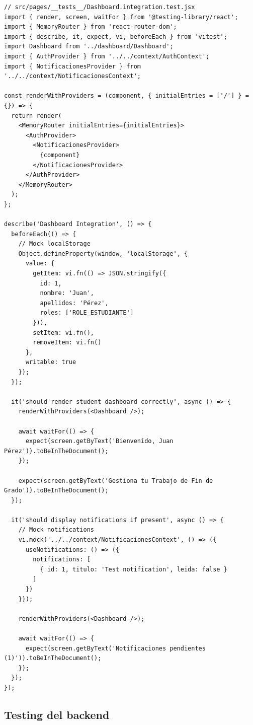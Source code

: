 \documentclass[12pt,a4paper,oneside]{report}
\begin{document}
\begin{lstlisting}
// src/pages/__tests__/Dashboard.integration.test.jsx
import { render, screen, waitFor } from '@testing-library/react';
import { MemoryRouter } from 'react-router-dom';
import { describe, it, expect, vi, beforeEach } from 'vitest';
import Dashboard from '../dashboard/Dashboard';
import { AuthProvider } from '../../context/AuthContext';
import { NotificacionesProvider } from '../../context/NotificacionesContext';

const renderWithProviders = (component, { initialEntries = ['/'] } = {}) => {
  return render(
    <MemoryRouter initialEntries={initialEntries}>
      <AuthProvider>
        <NotificacionesProvider>
          {component}
        </NotificacionesProvider>
      </AuthProvider>
    </MemoryRouter>
  );
};

describe('Dashboard Integration', () => {
  beforeEach(() => {
    // Mock localStorage
    Object.defineProperty(window, 'localStorage', {
      value: {
        getItem: vi.fn(() => JSON.stringify({
          id: 1,
          nombre: 'Juan',
          apellidos: 'Pérez',
          roles: ['ROLE_ESTUDIANTE']
        })),
        setItem: vi.fn(),
        removeItem: vi.fn()
      },
      writable: true
    });
  });

  it('should render student dashboard correctly', async () => {
    renderWithProviders(<Dashboard />);

    await waitFor(() => {
      expect(screen.getByText('Bienvenido, Juan Pérez')).toBeInTheDocument();
    });

    expect(screen.getByText('Gestiona tu Trabajo de Fin de Grado')).toBeInTheDocument();
  });

  it('should display notifications if present', async () => {
    // Mock notifications
    vi.mock('../../context/NotificacionesContext', () => ({
      useNotifications: () => ({
        notifications: [
          { id: 1, titulo: 'Test notification', leida: false }
        ]
      })
    }));

    renderWithProviders(<Dashboard />);

    await waitFor(() => {
      expect(screen.getByText('Notificaciones pendientes (1)')).toBeInTheDocument();
    });
  });
});
\end{lstlisting}

\subsection{Testing del backend}\label{testing-del-backend}
\end{document}
